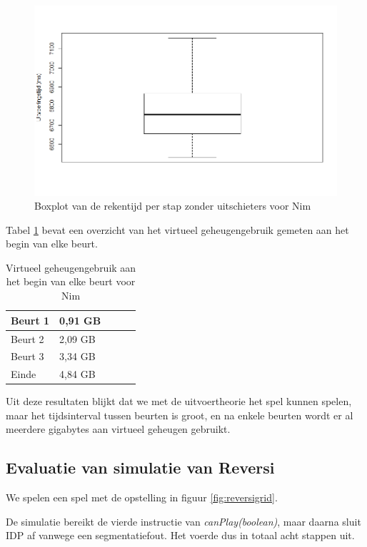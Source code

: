 \begin{figure}
	\includegraphics[width=1.05\textwidth]{chap-evaluatie/boxplotnooutliers.png}
	\caption{Boxplot van de rekentijd per stap zonder uitschieters voor Nim}
	\label{fig:ms-nooutliers}
\end{figure}

Tabel \ref{tab:sim-mem} bevat een overzicht van het virtueel geheugengebruik gemeten aan het begin van elke beurt.


\begin{table}[]
	\centering
	\begin{tabular}{|l|l|l|l|l|}
		\hline
		Beurt 1 & 0,91 GB  \\ \hline
		Beurt 2 & 2,09 GB  \\ \hline
		Beurt 3 & 3,34 GB  \\ \hline
		Einde   & 4,84 GB  \\ \hline
	\end{tabular}
	\caption{Virtueel geheugengebruik aan het begin van elke beurt voor Nim}
	\label{tab:sim-mem}
\end{table}

Uit deze resultaten blijkt dat we met de uitvoertheorie het spel kunnen spelen, maar het tijdsinterval tussen beurten is groot, en na enkele beurten wordt er al meerdere gigabytes aan virtueel geheugen gebruikt.

\subsection{Evaluatie van simulatie van Reversi}

We spelen een spel met de opstelling in figuur \ref{fig:reversigrid}.

De simulatie bereikt de vierde instructie van \textit{canPlay(boolean)}, maar daarna sluit IDP af vanwege een segmentatiefout. Het voerde dus in totaal acht stappen uit.

